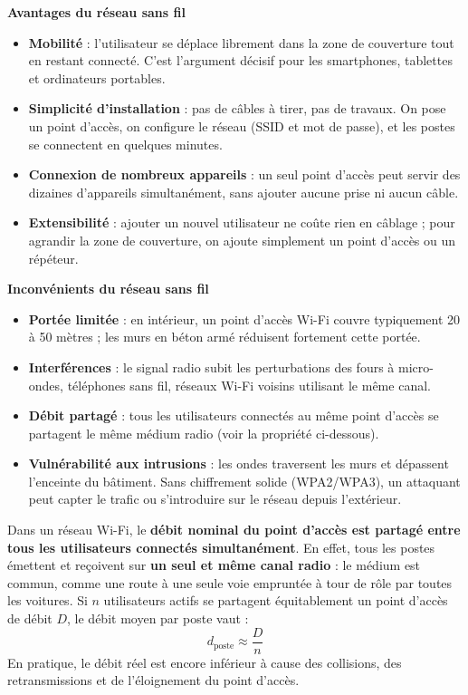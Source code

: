 \documentclass[11pt]{article}
\begin{document}
\textbf{Avantages du réseau sans fil}

\begin{itemize}
\item \textbf{Mobilité} : l'utilisateur se déplace librement dans la zone de couverture tout en restant connecté. C'est l'argument décisif pour les smartphones, tablettes et ordinateurs portables.
\item \textbf{Simplicité d'installation} : pas de câbles à tirer, pas de travaux. On pose un point d'accès, on configure le réseau (SSID et mot de passe), et les postes se connectent en quelques minutes.
\item \textbf{Connexion de nombreux appareils} : un seul point d'accès peut servir des dizaines d'appareils simultanément, sans ajouter aucune prise ni aucun câble.
\item \textbf{Extensibilité} : ajouter un nouvel utilisateur ne coûte rien en câblage ; pour agrandir la zone de couverture, on ajoute simplement un point d'accès ou un répéteur.
\end{itemize}

\textbf{Inconvénients du réseau sans fil}

\begin{itemize}
\item \textbf{Portée limitée} : en intérieur, un point d'accès Wi-Fi couvre typiquement 20 à 50 mètres ; les murs en béton armé réduisent fortement cette portée.
\item \textbf{Interférences} : le signal radio subit les perturbations des fours à micro-ondes, téléphones sans fil, réseaux Wi-Fi voisins utilisant le même canal.
\item \textbf{Débit partagé} : tous les utilisateurs connectés au même point d'accès se partagent le même médium radio (voir la propriété ci-dessous).
\item \textbf{Vulnérabilité aux intrusions} : les ondes traversent les murs et dépassent l'enceinte du bâtiment. Sans chiffrement solide (WPA2/WPA3), un attaquant peut capter le trafic ou s'introduire sur le réseau depuis l'extérieur.
\end{itemize}

\begin{propriete}
Dans un réseau Wi-Fi, le \textbf{débit nominal du point d'accès est partagé entre tous les utilisateurs connectés simultanément}. En effet, tous les postes émettent et reçoivent sur \textbf{un seul et même canal radio} : le médium est commun, comme une route à une seule voie empruntée à tour de rôle par toutes les voitures. Si $n$ utilisateurs actifs se partagent équitablement un point d'accès de débit $D$, le débit moyen par poste vaut :
\[ d_{\text{poste}} \approx \dfrac{D}{n} \]
En pratique, le débit réel est encore inférieur à cause des collisions, des retransmissions et de l'éloignement du point d'accès.
\end{propriete}
\end{document}
